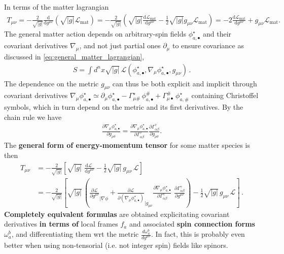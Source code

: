 \begin{mytheorem}
In terms of the matter lagrangian 
{\small
\begin{align}
    T_{\mu\nu} = -\frac{2}{\sqrt{|g|}} \frac{\mathrm{d}}{\mathrm{d} g^{\mu\nu}} \left(\sqrt{|g|} \mathcal{L}_\text{mat}\right)
    = -\frac{2}{\sqrt{|g|}} \left( \sqrt{|g|} \frac{\mathrm{d} \mathcal{L}_\text{mat}}{\mathrm{d} g^{\mu\nu}} -\frac{1}{2}\sqrt{|g|}g_{\mu\nu}\mathcal{L}_\text{mat} \right)
    = -2 \frac{\mathrm{d} \mathcal{L}_\text{mat}}{\mathrm{d} g^{\mu\nu}} + g_{\mu\nu} \mathcal{L}_\text{mat}.
\end{align}
}
The general matter action depends on arbitrary-spin fields $\phi_{a,\bullet}^{\star}$ and their covariant derivatives $\nabla_\mu$, and not just partial ones $\partial_\mu$ to ensure covariance as discussed in \eqref{eq:general_matter_lagrangian},
\begin{align}
    S=\int d^n x \sqrt{|g|} \,\mathcal{L}(\phi_{a,\bullet}^{\star},\nabla_\mu \phi_{a,\bullet}^{\star}, g_{\mu\nu})\,.
\end{align}
The dependence on the metric $g_{\mu\nu}$ can thus be both explicit and implicit through covariant derivatives $\nabla_\mu \phi^\star_{a,\bullet}\simeq \partial_\mu \phi^\star_{a,\bullet} -\Gamma_{\mu \#}^\star \,\phi^{\#}_{a,\bullet} + \Gamma_{\mu\bullet}^{\#}\,\phi^\star_{a,\#}$ containing Christoffel symbols, which in turn depend on the metric and its first derivatives.
By the chain rule we have
\begin{align}
    \frac{\partial \nabla_\mu \phi^\star_{a,\bullet}}{\partial g_{\rho\sigma}}= \frac{\partial \nabla_\mu \phi^\star_{a,\bullet}}{\partial \Gamma_{\alpha\beta}^\gamma} \frac{\partial \Gamma_{\alpha\beta}^\gamma}{\partial g_{\rho\sigma}}.
\end{align}
The \textbf{general form of energy-momentum tensor} for some matter species is then
{\small
\begin{align}
    T_{\mu\nu} &= -\frac{2}{\sqrt{|g|}} \left[ \sqrt{|g|} \,\,\frac{\mathrm{d} \mathcal{L}\,\,}{\mathrm{d} g^{\mu\nu}} -\frac{1}{2}\sqrt{|g|}\,g_{\mu\nu}\,\mathcal{L} \right]
    \\[4pt]
    &= -\frac{2}{\sqrt{|g|}} \left[\sqrt{|g|}\,\left( \frac{\partial \mathcal{L}}{\partial g^{\mu\nu}}_{\mid \nabla \phi} \!\!+\frac{\partial \mathcal{L}}{\partial \left(\nabla_\mu \phi^\star_{a,\bullet}\right)}_{\mid g_{\mu\nu}}\!\!\!\frac{\partial \nabla_\mu \phi^\star_{a,\bullet}}{\partial \Gamma_{\alpha\beta}^\gamma}\,\, \frac{\partial \Gamma_{\alpha\beta}^\gamma}{\partial g^{\mu\nu}}\right) -\frac{1}{2}\sqrt{|g|}\,g_{\mu\nu}\,\mathcal{L} \right]\,.
\end{align}
}
\textbf{Completely equivalent formulas} are obtained explicitating covariant derivatives \textbf{in terms of} local frames $f_a$ and associated \textbf{spin connection forms $\omega_a^b$}, and differentiating them wrt the metric $\frac{d\omega_a^b}{d g^{\mu\nu}}$.
In fact, this is probably even better when using non-tensorial (i.e. not integer spin) fields like spinors.


\end{mytheorem}
